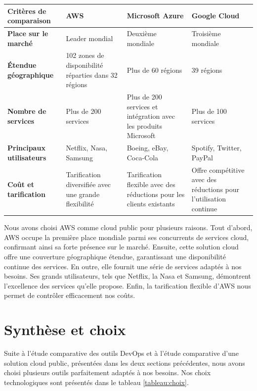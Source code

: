 \begin{table}[H]
\centering
\caption{Tableau comparatif des solutions cloud public AWS, Microsoft Azure et Google Cloud.}
\begin{longtable}{|p{3cm}|p{4cm}|p{4cm}|p{4cm}|}
\hline
\textbf{Critères de comparaison} & \textbf{AWS} & \textbf{Microsoft Azure} & \textbf{Google Cloud}\\
\hline
\textbf{Place sur le marché} & Leader mondial & Deuxième mondiale & Troisième mondiale \\
\hline
\textbf{Étendue géographique} & 102 zones de disponibilité réparties dans 32 régions & Plus de 60 régions & 39 régions \\
\hline
\textbf{Nombre de services} & Plus de 200 services & Plus de 200 services et intégration avec les produits Microsoft & Plus de 100 services\\
\hline
\textbf{Principaux utilisateurs} &  Netflix, Nasa, Samsung &  Boeing, eBay, Coca-Cola & Spotify, Twitter, PayPal \\
\hline
\textbf{Coût et tarification} & Tarification diversifiée avec une grande flexibilité  & Tarification flexible avec des réductions pour les clients existants & Offre compétitive avec des réductions pour l'utilisation continue \\ 
\hline
\end{longtable}
\label{tableau:comparatif7}
\end{table}
Nous avons choisi AWS comme cloud public pour plusieurs raisons. Tout d'abord, AWS occupe la première place mondiale parmi ses concurrents de services cloud, confirmant ainsi sa forte présence sur le marché. Ensuite, cette solution cloud offre une couverture géographique étendue, garantissant une disponibilité continue des services. En outre, elle fournit une série de services adaptés à nos besoins. Ses grands utilisateurs, tels que Netflix, la Nasa et Samsung, démontrent l'excellence des services qu'elle propose. Enfin, la tarification flexible d'AWS nous permet de contrôler efficacement nos coûts.

\section{Synthèse et choix}
Suite à l'étude comparative des outils DevOps et à l'étude comparative d'une solution cloud public, présentées dans les deux sections précédentes, nous avons choisi plusieurs outils parfaitement adaptés à nos besoins. Nos choix technologiques sont présentés dans le tableau \ref{tableau:choix}.

